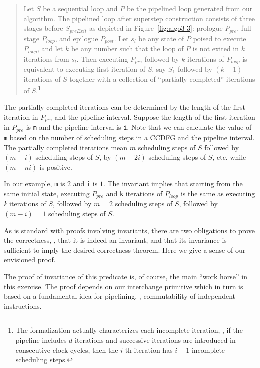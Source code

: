 \begin{quote}
Let $S$ be a sequential loop and $P$ be the pipelined loop
generated from our algorithm. The pipelined loop after superstep construction
consists of
three stages before $S_{preExit}$ as depicted in
Figure~\ref{fig:algo3-3}: prologue $P_{pre}$, full stage
$P_{loop}$, and epilogue $P_{post}$.  Let $s_l$ be any state of $P$
poised to execute $P_{loop}$, and let $k$ be any number such that
the loop of $P$ is not exited in $k$ iterations from $s_l$.
Then executing $P_{pre}$ followed by $k$ iterations of $P_{loop}$ is
equivalent to executing first iteration of $S$, say $S_1$
followed by $(k - 1)$ iterations of $S$ together with a
collection of ``partially completed'' iterations of
$S$.\footnote{The formalization actually characterizes each
  incomplete iteration, \eg, if the pipeline includes $d$
  iterations and successive iterations are introduced in
  consecutive clock cycles, then the $i$-th iteration has $i
  - 1$ incomplete scheduling steps.}
\end{quote}

The partially completed iterations can be determined by the
length of the first iteration in $P_{pre}$ and the pipeline interval.
Suppose the length of the first iteration in $P_{pre}$
is {\tt m} and the pipeline interval is {\tt i}. Note that we
can calculate the value of {\tt m} based on the number of scheduling steps in a CCDFG
and the pipeline interval. The partially completed iterations mean $m$
scheduling steps of $S$ followed by $(m-i)$ scheduling steps of $S$, by
$(m-2i)$ scheduling steps of $S$, etc. while $(m-ni)$ is positive.

In our example, {\tt m} is $2$
and {\tt i} is $1$.  The invariant implies that starting
from the same initial state, executing $P_{pre}$ and {\tt k}
iterations of $P_{loop}$ is the same as executing {\em k}
iterations of $S$, followed by $m = 2$ scheduling steps of
$S$, followed by $ (m - i) = 1$ scheduling steps of $S$.

As is standard with proofs involving invariants, there are
two obligations to prove the correctness, \viz, that it is indeed
an invariant, and that its invariance is sufficient to imply
the desired correctness theorem.  Here we give a sense of
our envisioned proof.

The proof of invariance of this predicate is, of course, the
main ``work horse'' in this exercise.  The proof depends on
our interchange primitive which in turn is based on a fundamental idea for pipelining,
\viz, commutability of independent instructions.


